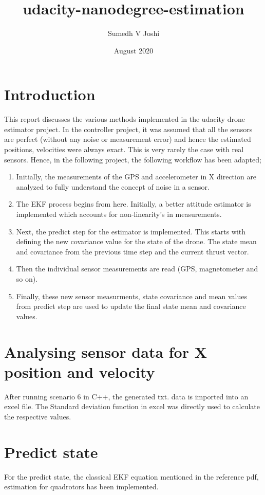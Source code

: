 \documentclass{article}
\title{udacity-nanodegree-estimation}
\author{Sumedh V Joshi }
\date{August 2020}
\begin{document}
\maketitle

\section{Introduction}
This report discusses the various methods implemented in the udacity drone estimator project. In the controller project, it was assumed that all the sensors are perfect (without any noise or measurement error) and hence the estimated positions, velocities were always exact. This is very rarely the case with real sensors. Hence, in the following project, the following workflow has been adapted;

\begin{enumerate}
    \item Initially, the measurements of the GPS and accelerometer in X direction are analyzed to fully understand the concept of noise in a sensor. 
    \item The EKF process begins from here. Initially, a better attitude estimator is implemented which accounts for non-linearity's in measurements. 
    \item Next, the predict step for the estimator is implemented. This starts with defining the new covariance value for the state of the drone. The state mean and covariance from the previous time step and the current thrust vector. 
    \item Then the individual sensor measurements are read (GPS, magnetometer and so on).
    \item Finally, these new sensor measurments, state covariance and mean values from predict step are used to update the final state mean and covariance values.
\end{enumerate}

\section{Analysing sensor data for X position and velocity}
After running scenario 6 in C++, the generated txt. data is imported into an excel file. The Standard deviation function in excel was directly used to calculate the respective values.

\section{Predict state}
For the predict state, the classical EKF equation mentioned in the reference pdf, estimation for quadrotors has been implemented. 
\end{document}
